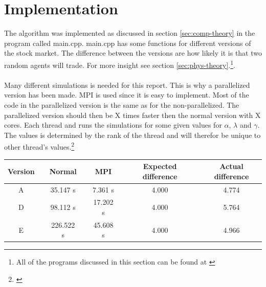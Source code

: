 \pagebreak
\section{Implementation}


The algorithm was implemented as discussed in section \ref{sec:comp-theory} in the program called main.cpp. main.cpp has some functions for different versions of the stock market. The difference between the versions are how likely it is that two random agents will trade. For more insight see section \ref{sec:phys-theory}.\footnote{All of the programs discussed in this section can be found at \href{https://github.com/erikfsk/Project-5}{\color{blue}{github}}}.
\\
\\
Many different simulations is needed for this report. This is why a parallelized version has been made. MPI is used since it is easy to implement. Most of the code in the parallelized version is the same as for the non-parallelized. The parallelized version should then be X times faster then the normal version with X cores. Each thread and runs the simulations for some given values for $\alpha$, $\lambda$ and $\gamma$. The values is determined by the rank of the thread and will therefor be unique to other thread's values.\footnote{\href{https://www.intel.com/content/www/us/en/architecture-and-technology/hyper-threading/hyper-threading-technology.html}{\color{blue}{Intel Hyper-Threading Technology}}}


\begin{center}
\label{tab:parallell}
\begin{tabularx}{\textwidth}{c X c X c X c X c}
    \hline 
    \hline 
       	Version && Normal && MPI && Expected difference && Actual difference\\ 
    \hline
        A   	&&      35.147  s	&&		7.361 s 	&&	4.000	&&	4.774	\\  
        D   	&&      98.112  s	&&		17.202 s	&&	4.000	&&	5.764	\\
        E   	&&      226.522 s	&&		45.608 s	&&	4.000	&&	4.966	\\
    \hline
\end{tabularx}
\end{center}


